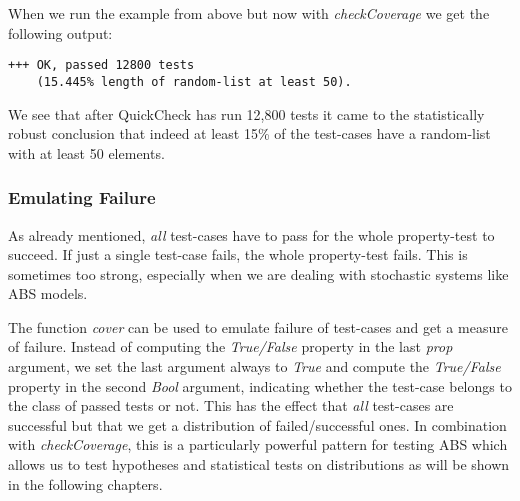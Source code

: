 When we run the example from above but now with \textit{checkCoverage} we get the following output:

\begin{verbatim}
+++ OK, passed 12800 tests 
    (15.445% length of random-list at least 50).
\end{verbatim}

We see that after QuickCheck has run 12,800 tests it came to the statistically robust conclusion that indeed at least 15\% of the test-cases have a random-list with at least 50 elements. 

\subsubsection*{Emulating Failure}
As already mentioned, \textit{all} test-cases have to pass for the whole property-test to succeed. If just a single test-case fails, the whole property-test fails. This is sometimes too strong, especially when we are dealing with stochastic systems like ABS models.

The function \textit{cover} can be used to emulate failure of test-cases and get a measure of failure. Instead of computing the \textit{True/False} property in the last \textit{prop} argument, we set the last argument always to \textit{True} and compute the \textit{True/False} property in the second \textit{Bool} argument, indicating whether the test-case belongs to the class of passed tests or not. This has the effect that \textit{all} test-cases are successful but that we get a distribution of failed/successful ones. In combination with \textit{checkCoverage}, this is a particularly powerful pattern for testing ABS which allows us to test hypotheses and statistical tests on distributions as will be shown in the following chapters.